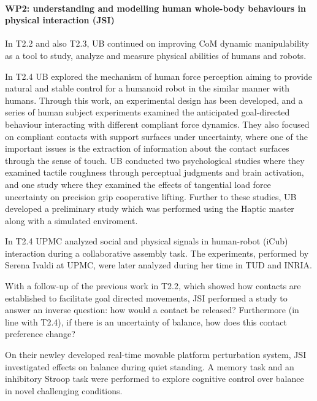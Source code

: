  
\paragraph*{WP2: understanding and modelling human whole-body behaviours in physical interaction (JSI)}

In T2.2 and also T2.3, UB continued on improving CoM dynamic manipulability as a tool to study, analyze and measure physical abilities of humans and robots.

In T2.4 UB explored the mechanism of human force perception aiming to provide natural and stable control for a humanoid robot in the similar manner with humans. Through this work, an experimental design has been developed, and a series of human subject experiments examined the anticipated goal-directed behaviour interacting with different compliant force dynamics. They also focused on compliant contacts with support surfaces under uncertainty, where one of the important issues is the extraction of information about the contact surfaces through the sense of touch. UB conducted two psychological studies where they examined tactile roughness through perceptual judgments and brain activation, and one study where they examined the effects of tangential load force uncertainty on precision grip cooperative lifting. Further to these studies, UB developed a preliminary study which was performed using the Haptic master along with a simulated enviroment. 

In T2.4 UPMC analyzed social and physical signals in human-robot (iCub) interaction during a collaborative assembly task. The experiments, performed by Serena Ivaldi at UPMC, were later analyzed during her time in TUD and INRIA.

With a follow-up of the previous work in T2.2, which showed how contacts are established to facilitate goal directed movements, JSI performed a study to answer an inverse question: how would a contact be released? Furthermore (in line with T2.4), if there is an uncertainty of balance, how does this contact preference change?

On their newley developed real-time movable platform perturbation system, JSI investigated effects on balance during quiet standing. A memory task and an inhibitory Stroop task were performed to explore cognitive control over balance in novel challenging conditions.

